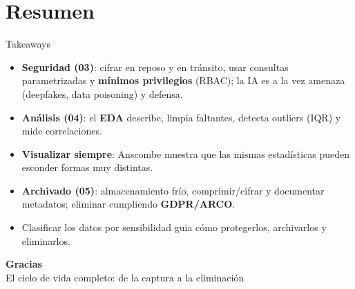 \documentclass[aspectratio=169]{beamer}
\begin{document}
\section{Resumen}

\begin{frame}{Takeaways}
  \begin{itemize}
    \item \textbf{Seguridad (03)}: cifrar en reposo y en tr\'ansito, usar
          consultas parametrizadas y \textbf{m\'inimos privilegios} (RBAC); la
          IA es a la vez amenaza (deepfakes, data poisoning) y defensa.
    \item \textbf{An\'alisis (04)}: el \textbf{EDA} describe, limpia faltantes,
          detecta outliers (IQR) y mide correlaciones.
    \item \textbf{Visualizar siempre}: Anscombe muestra que las mismas
          estad\'isticas pueden esconder formas muy distintas.
    \item \textbf{Archivado (05)}: almacenamiento fr\'io, comprimir/cifrar y
          documentar metadatos; eliminar cumpliendo \textbf{GDPR/ARCO}.
    \item Clasificar los datos por sensibilidad guia c\'omo protegerlos,
          archivarlos y eliminarlos.
  \end{itemize}
\end{frame}

\begin{frame}[plain]
  \molinaBanner
  \vfill
  \begin{center}
    {\color{molMorado}\Large\bfseries Gracias}\\[0.4em]
    {\color{molTeal} El ciclo de vida completo: de la captura a la eliminaci\'on}
  \end{center}
  \vfill\vspace{1.0cm}
  \molinaLogos
\end{frame}
\end{document}
